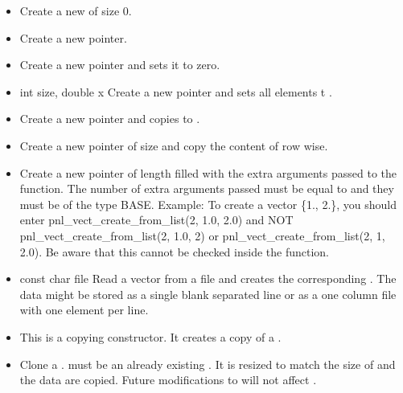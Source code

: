 \begin{itemize}
  \item {}
  \sshortdescribe Create a new  of size 0.  
\item {}
  \sshortdescribe Create a new  pointer.  
\item {}
  \sshortdescribe Create a new  pointer and sets it to zero.  
\item {}
  {int size, double x}
  \sshortdescribe Create a new  pointer and sets all
  elements t .  
\item {}
  \sshortdescribe Create a new  pointer and copies 
  to .  
\item {}
  \sshortdescribe Create a new  pointer of size 
  and copy the content of  row wise.
\item {}
  \sshortdescribe Create a new  pointer of length
   filled with the extra arguments passed to the function. The
  number of extra arguments passed must be equal to  and they must be of the type BASE.
  Example: To create a vector \{1., 2.\}, you should enter pnl_vect_create_from_list(2, 1.0, 2.0) and NOT pnl_vect_create_from_list(2, 1.0, 2) or pnl_vect_create_from_list(2, 1, 2.0).
  Be aware that this cannot be checked inside the function.
\item {}
  {const char \ptr file}
  \sshortdescribe Read a vector from a file and creates the corresponding
  . The data might be stored as a single blank separated line
  or as a one column file with one element per line.

\item {}
  \sshortdescribe This is a copying constructor. It creates a copy of a .
\item {} 
  \sshortdescribe Clone a .  must be an
  already existing  . It is resized to match the size of
   and the data are copied. Future modifications to  will not
  affect .


\end{itemize}
